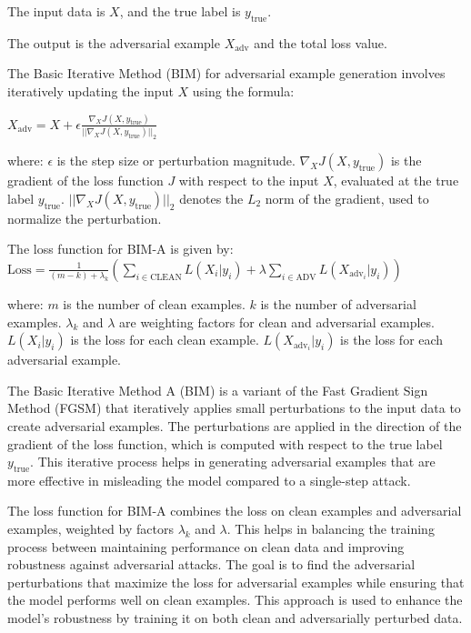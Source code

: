 
The input data is $X$, and the true label is $y_{\text{true}}$.

The output is the adversarial example $X_{\text{adv}}$ and the total loss value.

The Basic Iterative Method (BIM) for adversarial example generation involves iteratively updating the input $X$ using the formula:

$X_{\text{adv}} = X + \epsilon \frac{\nabla_X J(X, y_{\text{true}})} {||\nabla_X J(X, y_{\text{true}})||_2}$

where:
$\epsilon$ is the step size or perturbation magnitude.
$\nabla_X J(X, y_{\text{true}})$ is the gradient of the loss function $J$ with respect to the input $X$, evaluated at the true label $y_{\text{true}}$.
$||\nabla_X J(X, y_{\text{true}})||_2$ denotes the $L_2$ norm of the gradient, used to normalize the perturbation.


The loss function for BIM-A is given by:
$\text{Loss} = \frac{1}{{(m - k)} + \lambda_k } \left( \sum_{i \in \text{CLEAN}} L(X_i | y_i) + \lambda \sum_{i \in \text{ADV}} L(X_{\text{adv}_i} | y_i) \right)$

where:
$m$ is the number of clean examples.
$k$ is the number of adversarial examples.
$\lambda_k$ and $\lambda$ are weighting factors for clean and adversarial examples.
$L(X_i | y_i)$ is the loss for each clean example.
$L(X_{\text{adv}_i} | y_i)$ is the loss for each adversarial example.

The Basic Iterative Method A (BIM) is a variant of the Fast Gradient Sign Method (FGSM) that iteratively applies small perturbations to the input data to create adversarial examples. The perturbations are applied in the direction of the gradient of the loss function, which is computed with respect to the true label $y_{\text{true}}$. This iterative process helps in generating adversarial examples that are more effective in misleading the model compared to a single-step attack.

The loss function for BIM-A combines the loss on clean examples and adversarial examples, weighted by factors $\lambda_k$ and $\lambda$. This helps in balancing the training process between maintaining performance on clean data and improving robustness against adversarial attacks. The goal is to find the adversarial perturbations that maximize the loss for adversarial examples while ensuring that the model performs well on clean examples. This approach is used to enhance the model's robustness by training it on both clean and adversarially perturbed data.